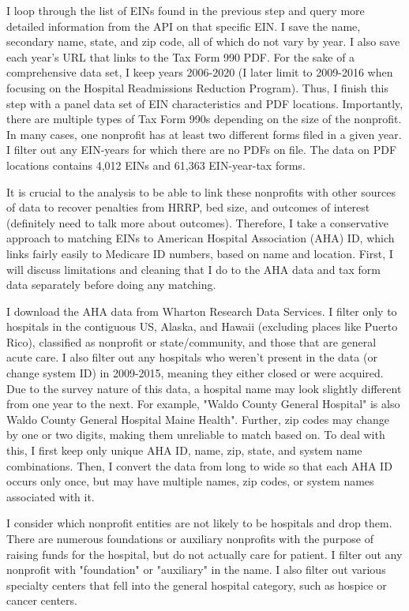 \documentclass[12pt]{article}
\begin{document}
    I loop through the list of EINs found in the previous step and query more detailed information from the API on that specific EIN. I save the name, secondary name, state, and zip code, all of which do not vary by year. I also save each year's URL that links to the Tax Form 990 PDF. For the sake of a comprehensive data set, I keep years 2006-2020 (I later limit to 2009-2016 when focusing on the Hospital Readmissions Reduction Program). Thus, I finish this step with a panel data set of EIN characteristics and PDF locations. Importantly, there are multiple types of Tax Form 990s depending on the size of the nonprofit. In many cases, one nonprofit has at least two different forms filed in a given year. I filter out any EIN-years for which there are no PDFs on file. The data on PDF locations contains 4,012 EINs and 61,363 EIN-year-tax forms.

    It is crucial to the analysis to be able to link these nonprofits with other sources of data to recover penalties from HRRP, bed size, and outcomes of interest (definitely need to talk more about outcomes). Therefore, I take a conservative approach to matching EINs to American Hospital Association (AHA) ID, which links fairly easily to Medicare ID numbers, based on name and location. First, I will discuss limitations and cleaning that I do to the AHA data and tax form data separately before doing any matching. 

    I download the AHA data from Wharton Research Data Services. I filter only to hospitals in the contiguous US, Alaska, and Hawaii (excluding places like Puerto Rico), classified as nonprofit or state/community, and those that are general acute care. I also filter out any hospitals who weren't present in the data (or change system ID) in 2009-2015, meaning they either closed or were acquired. Due to the survey nature of this data, a hospital name may look slightly different from one year to the next. For example, "Waldo County General Hospital" is also Waldo County General Hospital Maine Health". Further, zip codes may change by one or two digits, making them unreliable to match based on. To deal with this, I first keep only unique AHA ID, name, zip, state, and system name combinations. Then, I convert the data from long to wide so that each AHA ID occurs only once, but may have multiple names, zip codes, or system names associated with it.

    I consider which nonprofit entities are not likely to be hospitals and drop them. There are numerous foundations or auxiliary nonprofits with the purpose of raising funds for the hospital, but do not actually care for patient. I filter out any nonprofit with "foundation" or "auxiliary" in the name. I also filter out various specialty centers that fell into the general hospital category, such as hospice or cancer centers. 
\end{document}
